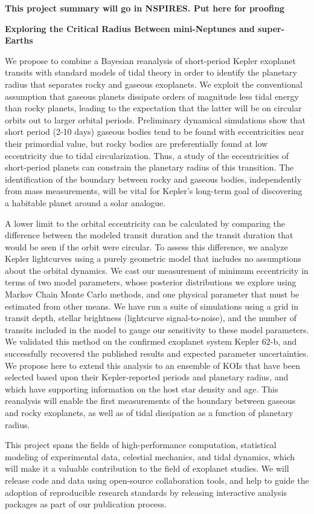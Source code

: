 \centerline{\bf This project summary will go in NSPIRES.  Put here for proofing} \medskip

\centerline{\bf Exploring the Critical Radius Between mini-Neptunes and super-Earths} \medskip

We propose to combine a Bayesian reanalysis of short-period Kepler
exoplanet transits with standard models of tidal theory in order to
identify the planetary radius that separates rocky and gaseous
exoplanets. We exploit the conventional assumption that gaseous
planets dissipate orders of magnitude less tidal energy than rocky
planets, leading to the expectation that the latter will be on
circular orbits out to larger orbital periods. Preliminary dynamical
simulations show that short period (2-10 days) gaseous bodies tend to
be found with eccentricities near their primordial value, but rocky
bodies are preferentially found at low eccentricity due to tidal
circularization.  Thus, a study of the eccentricities of short-period
planets can constrain the planetary radius of this transition.  The
identification of the boundary between rocky and gaseous bodies,
independently from mass measurements, will be vital for Kepler's
long-term goal of discovering a habitable planet around a solar
analogue.

A lower limit to the orbital eccentricity can be calculated by
comparing the difference between the modeled transit duration and the
transit duration that would be seen if the orbit were circular.  To
assess this difference, we analyze Kepler lightcurves using a purely
geometric model that includes no assumptions about the orbital
dynamics.  We cast our measurement of minimum eccentricity in terms of
two model parameters, whose posterior distributions we explore using
Markov Chain Monte Carlo methods, and one physical parameter that must
be estimated from other means.  We have run a suite of simulations
using a grid in transit depth, stellar brightness (lightcurve
signal-to-noise), and the number of transits included in the model to
gauge our sensitivity to these model parameters.
%
%
We validated this method on the confirmed exoplanet system Kepler
62-b, and successfully recovered the published results and expected
parameter uncertainties. We propose here to extend this analysis to an
ensemble of KOIs that have been selected based upon their
Kepler-reported periods and planetary radius, and which have
supporting information on the host star density and age.  This
reanalysis will enable the first measurements of the boundary between
gaseous and rocky exoplanets, as well as of tidal
dissipation as a function of planetary radius.

This project spans the fields of high-performance computation,
statistical modeling of experimental data, celestial mechanics, and
tidal dynamics, which will make it a valuable contribution to the
field of exoplanet studies.  We will release code and data using
open-source collaboration tools, and help to guide the adoption of
reproducible research standards by releasing interactive analysis
packages as part of our publication process.

